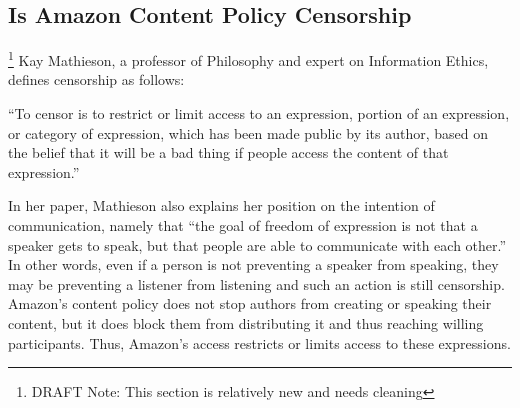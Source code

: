 \documentclass[11pt]{article}
\begin{document}
\begin{multicols}{2}




\subsection{Is Amazon Content Policy Censorship} \footnote{DRAFT Note: This section is relatively new and needs cleaning}
Kay Mathieson, a professor of Philosophy and expert on Information Ethics, defines censorship as follows:

``To censor is to restrict or limit access to an expression, portion of an expression, or category of expression, which has been made public by its author, based on the belief that it will be a bad thing if people access the content of that expression.'' \cite{MathiesenCensorship}

In her paper, Mathieson also explains her position on the intention of communication, namely that ``the goal of freedom of expression is not that a speaker gets to speak, but that people are able to communicate with each other.''  In other words, even if a person is not preventing a speaker from speaking, they may be preventing a listener from listening and such an action is still censorship.  Amazon's content policy does not stop authors from creating or speaking their content, but it does block them from distributing it and thus reaching willing participants.  Thus, Amazon's access restricts or limits access to these expressions.


\end{multicols}
\end{document}
